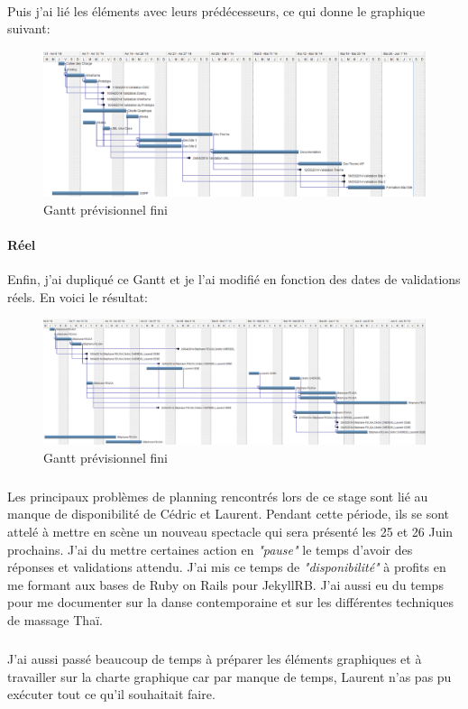 \documentclass[11pt,a4paper]{report}
\begin{document}
			\paragraph*{}Puis j'ai lié les éléments avec leurs prédécesseurs, ce qui donne le graphique suivant: 

				\begin{figure}[H]
					\centering
					\includegraphics[width=\textwidth]{Gantt_Previsionnel_2.eps}
					\caption{Gantt prévisionnel fini}
					\label{fig:Graphique Gantt Previsionnel}
				\end{figure}
			\paragraph*{Réel}Enfin, j'ai dupliqué ce Gantt et je l'ai modifié en fonction des dates de validations réels. En voici le résultat: 

				\begin{figure}[H]
					\centering
					\includegraphics[width=\textwidth]{Gantt_Reel_2.eps}
					\caption{Gantt prévisionnel fini}
					\label{fig:Gantt Reel}
				\end{figure}
				\subparagraph*{}Les principaux problèmes de planning rencontrés lors de ce stage sont lié au manque de disponibilité de Cédric et Laurent. Pendant cette période, ils se sont attelé à mettre en scène un nouveau spectacle qui sera présenté les 25 et 26 Juin prochains. J'ai du mettre certaines action en \textit{"pause"} le temps d'avoir des réponses et validations attendu. J'ai mis ce temps de \textit{"disponibilité"} à profits en me formant aux bases de Ruby on Rails pour JekyllRB. J'ai aussi eu du temps pour me documenter sur la danse contemporaine et sur les différentes techniques de massage Thaï.
				\subparagraph*{}J'ai aussi passé beaucoup de temps à préparer les éléments graphiques et à travailler sur la charte graphique car par manque de temps, Laurent n'as pas pu exécuter tout ce qu'il souhaitait faire.
				\newpage
\end{document}

